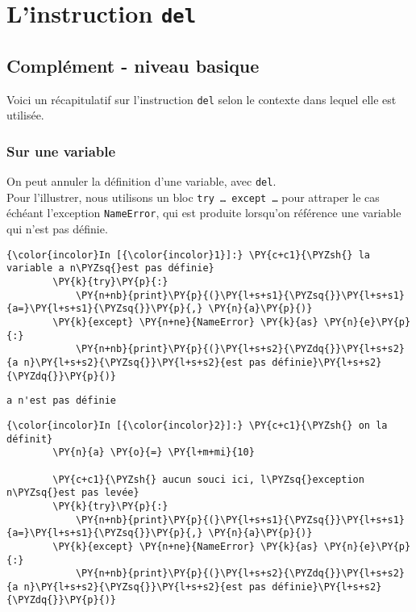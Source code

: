     \hypertarget{linstruction-del}{%
\section{\texorpdfstring{L'instruction
\texttt{del}}{L'instruction del}}\label{linstruction-del}}

    \hypertarget{compluxe9ment---niveau-basique}{%
\subsection{Complément - niveau
basique}\label{compluxe9ment---niveau-basique}}

    Voici un récapitulatif sur l'instruction \texttt{del} selon le contexte
dans lequel elle est utilisée.

    \hypertarget{sur-une-variable}{%
\subsubsection{Sur une variable}\label{sur-une-variable}}

    On peut annuler la définition d'une variable, avec \texttt{del}.\\

Pour l'illustrer, nous utilisons un bloc
\texttt{try\ \ldots{}\ except\ \ldots{}} pour attraper le cas échéant
l'exception \texttt{NameError}, qui est produite lorsqu'on référence une
variable qui n'est pas définie.

    \begin{Verbatim}[commandchars=\\\{\}]
{\color{incolor}In [{\color{incolor}1}]:} \PY{c+c1}{\PYZsh{} la variable a n\PYZsq{}est pas définie}
        \PY{k}{try}\PY{p}{:}
            \PY{n+nb}{print}\PY{p}{(}\PY{l+s+s1}{\PYZsq{}}\PY{l+s+s1}{a=}\PY{l+s+s1}{\PYZsq{}}\PY{p}{,} \PY{n}{a}\PY{p}{)}
        \PY{k}{except} \PY{n+ne}{NameError} \PY{k}{as} \PY{n}{e}\PY{p}{:}
            \PY{n+nb}{print}\PY{p}{(}\PY{l+s+s2}{\PYZdq{}}\PY{l+s+s2}{a n}\PY{l+s+s2}{\PYZsq{}}\PY{l+s+s2}{est pas définie}\PY{l+s+s2}{\PYZdq{}}\PY{p}{)}
\end{Verbatim}


    \begin{Verbatim}[commandchars=\\\{\}]
a n'est pas définie

    \end{Verbatim}

    \begin{Verbatim}[commandchars=\\\{\}]
{\color{incolor}In [{\color{incolor}2}]:} \PY{c+c1}{\PYZsh{} on la définit}
        \PY{n}{a} \PY{o}{=} \PY{l+m+mi}{10}
        
        \PY{c+c1}{\PYZsh{} aucun souci ici, l\PYZsq{}exception n\PYZsq{}est pas levée}
        \PY{k}{try}\PY{p}{:}
            \PY{n+nb}{print}\PY{p}{(}\PY{l+s+s1}{\PYZsq{}}\PY{l+s+s1}{a=}\PY{l+s+s1}{\PYZsq{}}\PY{p}{,} \PY{n}{a}\PY{p}{)}
        \PY{k}{except} \PY{n+ne}{NameError} \PY{k}{as} \PY{n}{e}\PY{p}{:}
            \PY{n+nb}{print}\PY{p}{(}\PY{l+s+s2}{\PYZdq{}}\PY{l+s+s2}{a n}\PY{l+s+s2}{\PYZsq{}}\PY{l+s+s2}{est pas définie}\PY{l+s+s2}{\PYZdq{}}\PY{p}{)}
\end{Verbatim}


